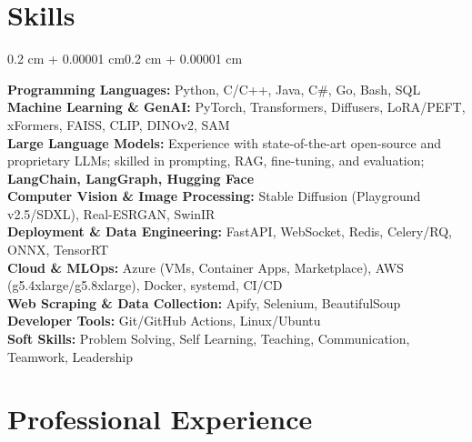 \documentclass[10pt, letterpaper]{article}
\newenvironment{onecolentry}{
  \begin{adjustwidth}{0.2 cm + 0.00001 cm}{0.2 cm + 0.00001 cm}
}{
  \end{adjustwidth}
}
\begin{document}
\section{Skills}
\begin{onecolentry}
  \textbf{Programming Languages:} Python, C/C++, Java, C\#, Go, Bash, SQL \\[4pt]
  \textbf{Machine Learning \& GenAI:} PyTorch, Transformers, Diffusers, LoRA/PEFT, xFormers, FAISS, CLIP, DINOv2, SAM \\[4pt]
  \textbf{Large Language Models:} Experience with state-of-the-art open-source and proprietary LLMs; skilled in prompting, RAG, fine-tuning, and evaluation; \textbf{LangChain, LangGraph, Hugging Face} \\[4pt]
  \textbf{Computer Vision \& Image Processing:} Stable Diffusion (Playground v2.5/SDXL), Real-ESRGAN, SwinIR \\[4pt]
  \textbf{Deployment \& Data Engineering:} FastAPI, WebSocket, Redis, Celery/RQ, ONNX, TensorRT \\[4pt]
  \textbf{Cloud \& MLOps:} Azure (VMs, Container Apps, Marketplace), AWS (g5.4xlarge/g5.8xlarge), Docker, systemd, CI/CD \\[4pt]
  \textbf{Web Scraping \& Data Collection:} Apify, Selenium, BeautifulSoup \\[4pt]
  \textbf{Developer Tools:} Git/GitHub Actions, Linux/Ubuntu \\[4pt]
  \textbf{Soft Skills:} Problem Solving, Self Learning, Teaching, Communication, Teamwork, Leadership
\end{onecolentry}

\section{Professional Experience}
\end{document}
